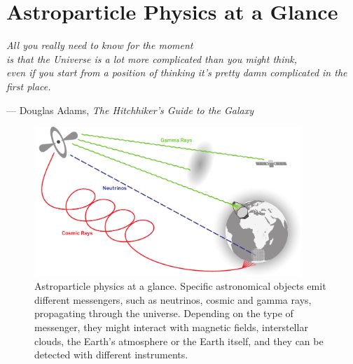 \chapter{Astroparticle Physics at a Glance}

\begin{flushright}
    \textit{All you really need to know for the moment \\is that the Universe is a lot more complicated than you might think, \\even if you start from a position of thinking it’s pretty damn complicated in the first place.}

    \vspace{0.3cm}
    --- Douglas Adams, \textit{The Hitchhiker's Guide to the Galaxy}
    \vspace{0.3cm}
\end{flushright}

%
\begin{figure}
    \centering
    \includegraphics[width=0.9\textwidth]{./figures/agn_earth_messenger.pdf}
    \caption{Astroparticle physics at a glance. Specific astronomical objects emit different messengers, such as neutrinos, cosmic and gamma rays, propagating through the universe. Depending on the type of messenger, they might interact with magnetic fields, interstellar clouds, the Earth's atmosphere or the Earth itself, and they can be detected with different instruments.}
    \label{fig:overview_astro}
\end{figure}
%

\blindtext[4]


